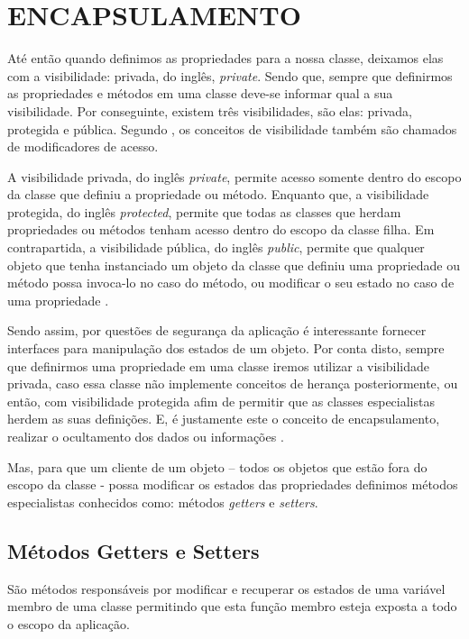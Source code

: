 \section{ENCAPSULAMENTO}

Até então quando definimos as propriedades para a nossa classe, deixamos elas 
com a visibilidade: privada, do inglês, \textit{private}. Sendo que, sempre que 
definirmos as propriedades e métodos em uma classe deve-se informar qual a  sua
visibilidade. Por conseguinte, existem três visibilidades, são elas: privada, 
protegida e pública. Segundo , os conceitos de 
visibilidade também são chamados de modificadores de acesso.

A visibilidade privada, do inglês \textit{private}, permite acesso somente
dentro do escopo da classe que definiu a propriedade ou método. Enquanto que, a 
visibilidade protegida, do inglês \textit{protected}, permite que todas as
classes  que herdam propriedades ou métodos tenham acesso dentro do escopo da classe filha. 
Em contrapartida, a visibilidade pública, do inglês \textit{public}, permite que
qualquer objeto que tenha instanciado um objeto da classe que definiu uma propriedade ou 
método possa invoca-lo no caso do método, ou modificar o seu estado no caso de 
uma propriedade \cite{learningJava}.

Sendo assim, por questões de segurança da aplicação é interessante fornecer
interfaces para manipulação dos estados de um objeto. Por conta disto,  sempre
que definirmos uma propriedade em uma classe iremos utilizar a visibilidade 
privada, caso essa classe não implemente conceitos de herança posteriormente, 
ou então, com visibilidade protegida afim de permitir que as classes 
especialistas herdem as suas definições. E, é justamente este o conceito de
encapsulamento, realizar o ocultamento dos dados ou informações \cite{javaComoProgramar}.

Mas, para que um cliente de um objeto – todos os objetos que estão fora do
escopo da classe -  possa modificar os estados das propriedades definimos 
métodos especialistas conhecidos como: métodos \textit{getters} e
\textit{setters}.

\subsection{Métodos Getters e Setters}

São métodos responsáveis por modificar e recuperar os estados de uma variável
membro de uma classe permitindo que esta função membro esteja exposta a todo o 
escopo da aplicação.

